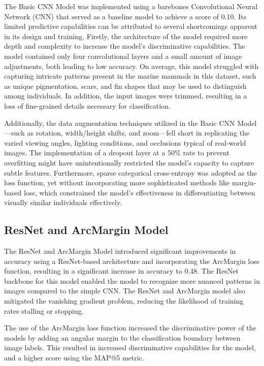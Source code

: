 \documentclass[twocolumn]{article}
\begin{document}
The Basic CNN Model was implemented using a barebones Convolutional Neural Network (CNN) that served as a baseline model to achieve a score of 0.10. Its limited predictive capabilities can be attributed to several shortcomings apparent in its design and training. Firstly, the architecture of the model required more depth and complexity to increase the model’s discriminative capabilities. The model contained only four convolutional layers and a small amount of image adjustments, both leading to low accuracy. On average, this model struggled with capturing intricate patterns present in the marine mammals in this dataset, such as unique pigmentation, scars, and fin shapes that may be used to distinguish among individuals. In addition, the input images were trimmed, resulting in a loss of fine-grained details necessary for classification. 

Additionally, the data augmentation techniques utilized in the Basic CNN Model—such as rotation, width/height shifts, and zoom—fell short in replicating the varied viewing angles, lighting conditions, and occlusions typical of real-world images. The implementation of a dropout layer at a 50\% rate to prevent overfitting might have unintentionally restricted the model’s capacity to capture subtle features. Furthermore, sparse categorical cross-entropy was adopted as the loss function, yet without incorporating more sophisticated methods like margin-based loss, which constrained the model’s effectiveness in differentiating between visually similar individuals effectively.

\subsection{ResNet and ArcMargin Model}

The ResNet and ArcMargin Model introduced significant improvements in accuracy using a ResNet-based architecture and incorporating the ArcMargin loss function, resulting in a significant increase in accuracy to 0.48. The ResNet backbone for this model enabled the model to recognize more nuanced patterns in images compared to the simple CNN. The ResNet and ArcMargin model also mitigated the vanishing gradient problem, reducing the likelihood of training rates stalling or stopping.

The use of the ArcMargin loss function increased the discriminative power of the models by adding an angular margin to the classification boundary between image labels. This resulted in increased discriminative capabilities for the model, and a higher score using the MAP@5 metric.
\end{document}
